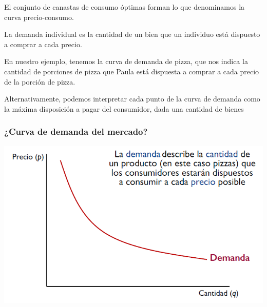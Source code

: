 \documentclass{beamer}
\begin{document}
\begin{frame}
  \begin{boxA}
    \begin{center}
      El conjunto de canastas de consumo óptimas forman lo que denominamos la curva precio-consumo.
    \end{center}
  \end{boxA}

  \begin{boxA}
    \begin{center}
      La demanda individual es la cantidad de un bien que un individuo está dispuesto a comprar a cada precio.
    \end{center}
  \end{boxA}
  \begin{center}
    En nuestro ejemplo, tenemos la curva de demanda de pizza, que nos indica la cantidad de porciones de pizza que Paula está dispuesta a comprar a cada precio de la porción de pizza.
  \end{center}
  \begin{boxA}
    \begin{center}
      Alternativamente, podemos interpretar cada punto de la curva de demanda como la máxima disposición a pagar del consumidor, dada una cantidad de bienes
    \end{center}
  \end{boxA}
\end{frame}

\begin{frame}
\frametitle{¿Curva de demanda del mercado?}
\centering
\includegraphics[scale=0.6]{../Figures/Tema_02.58_demanda.png}
\end{frame}
\end{document}
